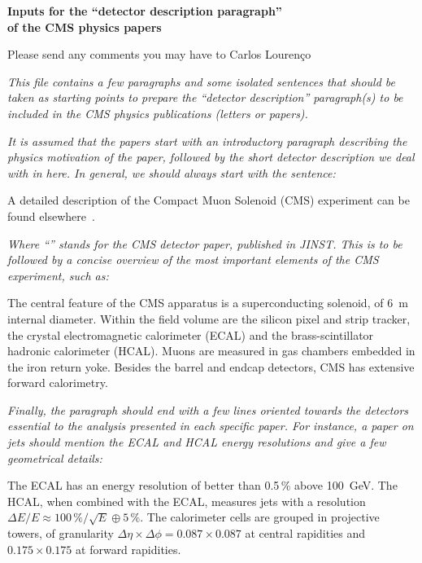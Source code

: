 \documentclass[12pt]{article}
\begin{document}
\begin{center}
{\large
\textbf{Inputs for the ``detector description paragraph''\\ of the CMS physics papers}}

\medskip
Please send any comments you may have to Carlos Louren\c{c}o
\end{center}

\medskip

\emph{This file contains a few paragraphs and some isolated sentences
  that should be taken as starting points to prepare the ``detector
  description'' paragraph(s) to be included in the CMS physics
  publications (letters or papers).}

\emph{It is assumed that the papers start with an introductory
  paragraph describing the physics motivation of the paper, followed
  by the short detector description we deal with in here.  In general,
  we should always start with the sentence:}

A detailed description of the Compact Muon Solenoid (CMS) experiment
can be found elsewhere~\cite{JINST}.

\emph{Where ``\cite{JINST}'' stands for the CMS detector paper,
  published in JINST.  This is to be followed by a concise overview of
  the most important elements of the CMS experiment, such as:}

The central feature of the CMS apparatus is a superconducting
solenoid, of 6~m internal diameter.  Within the field volume are the
silicon pixel and strip tracker, the crystal electromagnetic
calorimeter (ECAL) and the brass-scintillator hadronic calorimeter
(HCAL).  Muons are measured in gas chambers embedded in the iron
return yoke.  Besides the barrel and endcap detectors, CMS has
extensive forward calorimetry.

\emph{Finally, the paragraph should end with a few lines oriented
  towards the detectors essential to the analysis presented in each
  specific paper.  For instance, a paper on jets should mention the
  ECAL and HCAL energy resolutions and give a few geometrical
  details:}

The ECAL has an energy resolution of better than 0.5\,\% above
100~GeV.  The HCAL, when combined with the ECAL, measures jets with a
resolution $\Delta E/E \approx 100\,\% / \sqrt{E} \oplus 5\,\%$.  The
calorimeter cells are grouped in projective towers, of granularity
$\Delta \eta \times \Delta \phi = 0.087\times0.087$ at central
rapidities and $0.175\times0.175$ at forward rapidities.
\end{document}
